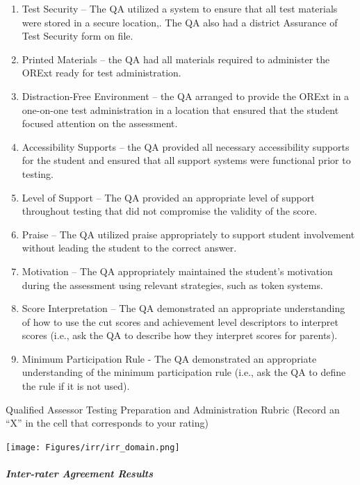 \documentclass[]{article}
\let\oldsubparagraph\subparagraph
\renewcommand{\subparagraph}[1]{\oldsubparagraph{#1}\mbox{}}
\begin{document}
\begin{enumerate}
\def\labelenumi{\arabic{enumi}.}
\item
  Test Security -- The QA utilized a system to ensure that all test
  materials were stored in a secure location,. The QA also had a
  district Assurance of Test Security form on file.
\item
  Printed Materials -- the QA had all materials required to administer
  the ORExt ready for test administration.
\item
  Distraction-Free Environment -- the QA arranged to provide the ORExt
  in a one-on-one test administration in a location that ensured that
  the student focused attention on the assessment.
\item
  Accessibility Supports -- the QA provided all necessary accessibility
  supports for the student and ensured that all support systems were
  functional prior to testing.
\item
  Level of Support -- The QA provided an appropriate level of support
  throughout testing that did not compromise the validity of the score.
\item
  Praise -- The QA utilized praise appropriately to support student
  involvement without leading the student to the correct answer.
\item
  Motivation -- The QA appropriately maintained the student's motivation
  during the assessment using relevant strategies, such as token
  systems.
\item
  Score Interpretation -- The QA demonstrated an appropriate
  understanding of how to use the cut scores and achievement level
  descriptors to interpret scores (i.e., ask the QA to describe how they
  interpret scores for parents).
\item
  Minimum Participation Rule - The QA demonstrated an appropriate
  understanding of the minimum participation rule (i.e., ask the QA to
  define the rule if it is not used).
\end{enumerate}

Qualified Assessor Testing Preparation and Administration Rubric (Record
an ``X'' in the cell that corresponds to your rating)

\FloatBarrier

\texttt{[image: Figures/irr/irr\_domain.png]}

\FloatBarrier

\hypertarget{inter-rater-agreement-results}{%
\subparagraph{Inter-rater Agreement
Results}\label{inter-rater-agreement-results}}
\end{document}
